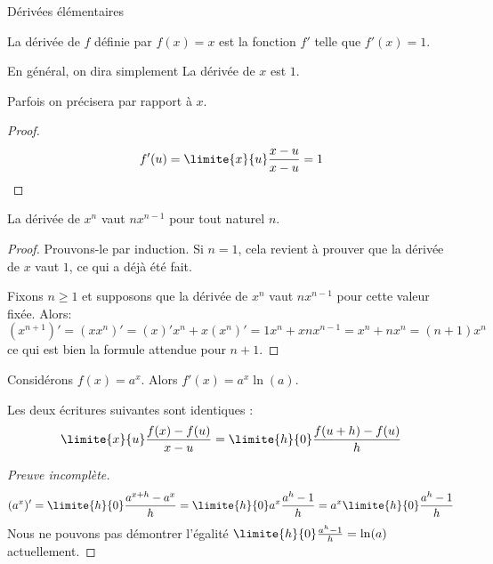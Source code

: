 \begin{frame}{Dérivées élémentaires}
  \begin{proposition}
    La dérivée de \(f\) définie par \(f(x) = x\) est la fonction \(f'\) telle que \(f'(x) = 1\).\pause

    En général, on dira simplement \og La dérivée de \(x\) est \(1\)\fg{}.\pause

    Parfois on précisera \og par rapport à \(x\)\fg{}.
  \end{proposition}
  \begin{proof}
    \begin{equation*}
    f'(u) = \limite{x}{u} \frac{x-u}{x-u} = 1
  \end{equation*}
  \end{proof}
\end{frame}
\begin{frame}
  \begin{proposition}
    La dérivée de \(x^{n}\) vaut \(n x^{n-1}\) pour tout naturel \(n\).
  \end{proposition}
  \begin{proof}
    Prouvons-le par induction. Si \(n = 1\), cela revient à prouver que la dérivée de \(x\) vaut \(1\), ce qui a déjà été fait.\pause

    Fixons \(n \geq 1\) et supposons que la dérivée de \(x^{n}\) vaut \(nx^{n-1}\) pour cette valeur fixée.\pause{} Alors:
    \begin{equation*}
      (x^{n+1})' = (x x^{n})' = (x)' x^{n} + x (x^{n})' = 1 x^{n} + x n x^{n-1} = x^{n} + n x^{n} = (n+1) x^{n}
    \end{equation*}
    ce qui est bien la formule attendue pour \(n+1\).
  \end{proof}
\end{frame}
\begin{frame}
  \begin{proposition}
    Considérons \(f(x) = a^{x}\). Alors \(f'(x) = a^{x} \ln(a)\).
  \end{proposition}
  \begin{remark*}\pause
    Les deux écritures suivantes sont identiques :
    \begin{equation*}
      \limite{x}{u} \frac{f(x)-f(u)}{x-u} = \limite{h}{0} \frac{f(u+h) - f(u)}{h}
    \end{equation*}
  \end{remark*}\pause
  \begin{proof}[Preuve incomplète]\pause%
    \begin{equation*}
      (a^{x})' = \limite{h}{0} \frac{a^{x+h}-a^{x}}{h} = \limite{h}{0} a^{x} \frac{a^{h} - 1}{h} = a^{x} \limite{h}{0} \frac{a^{h}-1}{h}
    \end{equation*}
    Nous ne pouvons pas démontrer l'égalité \(\limite{h}{0} \frac{a^{h}-1}{h} = \ln(a)\) actuellement.
  \end{proof}
\end{frame}
